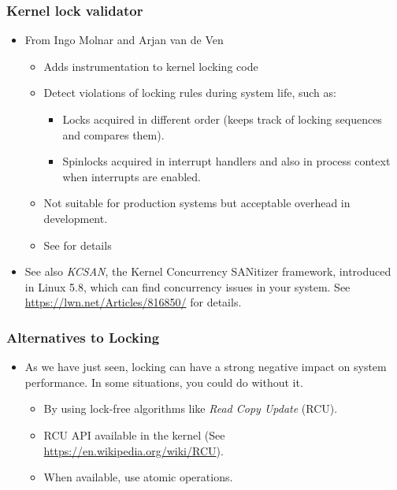 \begin{frame}
  \frametitle{Kernel lock validator}
  \begin{itemize}
  \item From Ingo Molnar and Arjan van de Ven
    \begin{itemize}
    \item Adds instrumentation to kernel locking code
    \item Detect violations of locking rules during system life, such
      as:
      \begin{itemize}
      \item Locks acquired in different order (keeps track of locking
        sequences and compares them).
      \item Spinlocks acquired in interrupt handlers and also in
        process context when interrupts are enabled.
      \end{itemize}
    \item Not suitable for production systems but acceptable overhead
      in development.
    \item See  for details
    \end{itemize}
  \item See also {\em KCSAN}, the Kernel Concurrency SANitizer
        framework, introduced in Linux 5.8, which can find concurrency issues in your system. See
        \url{https://lwn.net/Articles/816850/} for details.
  \end{itemize}
\end{frame}

\begin{frame}
  \frametitle{Alternatives to Locking}
  \begin{itemize}
  \item As we have just seen, locking can have a strong negative
    impact on system performance. In some situations, you could do
    without it.
    \begin{itemize}
    \item By using lock-free algorithms like \emph{Read Copy Update}
      (RCU).
    \item RCU API available in the kernel (See
      \url{https://en.wikipedia.org/wiki/RCU}).
    \item When available, use atomic operations.
    \end{itemize}
  \end{itemize}
\end{frame}


